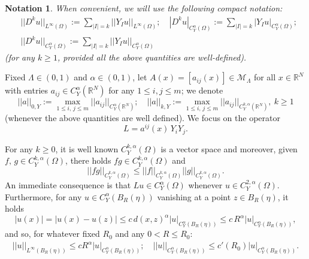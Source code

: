 \documentclass{article}
\newtheorem{notation}[theorem]{Notation}
\numberwithin{equation}{section}
\begin{document}
\vspace{2mm}

\begin{notation}
    When convenient, we will use the following compact notation:
    \begin{align*}
        & ||D^k u||_{L^{\infty}(\Omega)} := \sum_{|I|=k} ||Y_I u||_{L^{\infty}(\Omega)}; \quad |D^k u|_{C^{\alpha}_Y(\Omega)} := \sum_{|I|=k} |Y_I u|_{C^{\alpha}_Y(\Omega)}; \\
        & ||D^k u||_{C^{\alpha}_Y(\Omega)} := \sum_{|I|=k} ||Y_I u||_{C^{\alpha}_Y(\Omega)}
    \end{align*}
    (for any $k \geq 1$, provided all the above quantities are well-defined).
\end{notation}

\vspace{2mm}

Fixed $\Lambda \in (0,1)$ and $\alpha \in (0,1)$, let $A(x)=[a_{ij}(x)] \in \mathcal{M}_{\Lambda}$ for all $x \in  \mathbb{R}^N$ with entries $a_{ij} \in C^{\alpha}_Y(\mathbb{R}^N)$ for any $1 \leq i,j \leq m$; we denote
\begin{equation*}
    ||a||_{0,Y} := \max_{1 \leq i,\, j \leq m} ||a_{ij}||_{C^{\alpha}_Y(\mathbb{R}^N)}; \quad ||a||_{k,Y} := \max_{1 \leq i,\, j \leq m} ||a_{ij}||_{C^{k,\alpha}_Y(\mathbb{R}^N)},\: k \geq 1
\end{equation*}
(whenever the above quantities are well defined).
We focus on the operator
\begin{equation}
\label{our operator L_Y Carnot}
    L=a^{ij}(x) \, Y_i Y_j.
\end{equation}

\vspace{2mm}

For any $k \geq 0$, it is well known $C^{k,\alpha}_Y(\Omega)$ is a vector space and moreover, given $f, \, g \in C^{k,\alpha}_Y(\Omega)$, there holds $fg \in C^{k,\alpha}_Y(\Omega)$ and
\begin{equation}
\label{Hölder norm of a product}
    ||fg||_{C^{k,\alpha}_Y(\Omega)} \leq ||f||_{C^{k,\alpha}_Y(\Omega)} ||g||_{C^{k,\alpha}_Y(\Omega)}.
\end{equation}
An immediate consequence is that $Lu \in C^{\alpha}_Y(\Omega)$ whenever $u \in C^{2,\alpha}_Y(\Omega)$. Furthermore, for any $u \in C^{\alpha}_Y(B_R(\eta))$ vanishing at a point $z \in B_R(\eta)$, it holds
\begin{equation*}
        |u(x)|=|u(x)-u(z)| \leq c \, d(x,z)^{\alpha} |u|_{C^{\alpha}_Y(B_R(\eta))} \leq c \, R^{\alpha} |u|_{C^{\alpha}_Y(B_R(\eta))},
    \end{equation*}
    and so, for whatever fixed $R_0$ and any $0<R \leq R_0$:
    \begin{align}
    \label{Hölder norm vs seminorm for u that vanishes at a point}
        ||u||_{L^{\infty}(B_R(\eta))} \leq cR^{\alpha} |u|_{{C^{\alpha}_Y(B_R(\eta))}}; \quad ||u||_{C^{\alpha}_Y(B_R(\eta))} \leq c'(R_0)|u|_{C^{\alpha}_Y(B_R(\eta))}.
    \end{align}
\end{document}

